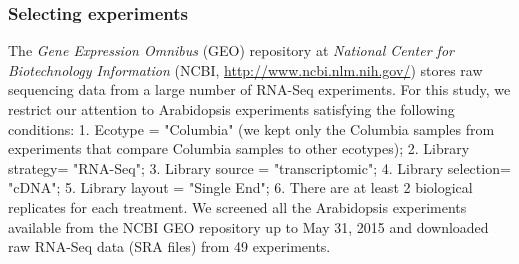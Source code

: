 \documentclass[11pt, a4paper]{article}
\begin{document}
\subsubsection*{Selecting experiments} 
The \textit{Gene Expression Omnibus} (GEO) repository at \textit{National
Center for Biotechnology Information} (NCBI,
\url{http://www.ncbi.nlm.nih.gov/}) stores raw sequencing data from a large
number of RNA-Seq experiments.  For this study, we restrict our attention to
Arabidopsis experiments satisfying the following conditions: 1.  Ecotype =
"Columbia" (we kept only the Columbia samples from experiments that compare
Columbia samples to other ecotypes); 2. Library strategy= "RNA-Seq"; 3.
Library source = "transcriptomic"; 4.  Library selection= "cDNA"; 5.  Library
layout = "Single End"; 6. There are at least 2 biological replicates for each
treatment. We screened all the Arabidopsis experiments available from the NCBI
GEO repository up to May 31, 2015 and downloaded raw RNA-Seq data (SRA files)
from 49 experiments. %
\end{document}
